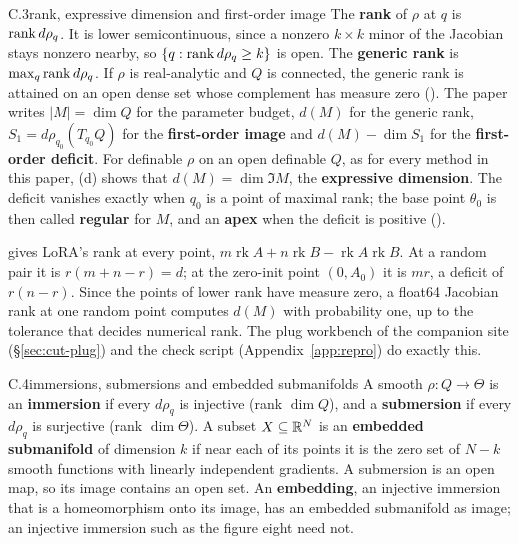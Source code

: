 \begin{bgentry}{C.3}{rank, expressive dimension and first-order image}
The \textbf{rank} of $\rho$ at $q$ is $\operatorname{rank} d\rho_q$. It is lower semicontinuous, since a nonzero $k\times k$ minor of
the Jacobian stays nonzero nearby, so $\{q:\operatorname{rank} d\rho_q\ge k\}$ is open. The \textbf{generic rank} is $\max_q\operatorname{rank}
d\rho_q$. If $\rho$ is real-analytic and $Q$ is connected, the generic rank is attained on an open dense set whose
complement has measure zero (). The paper writes $\lvert M\rvert=\dim Q$ for the parameter budget, $d(M)$
for the generic rank, $S_1=d\rho_{q_0}(T_{q_0}Q)$ for the \textbf{first-order image} and $d(M)-\dim S_1$ for the
\textbf{first-order deficit}. For definable $\rho$ on an open definable $Q$, as for every method in this paper,
(d) shows that $d(M)=\dim\Im M$, the \textbf{expressive dimension}. The deficit vanishes exactly when $q_0$
is a point of maximal rank; the base point $\theta_0$ is then called \textbf{regular} for $M$, and an \textbf{apex} when
the deficit is positive ().
\end{bgentry}

 gives LoRA's rank at every point,
$m\operatorname{rk}A+n\operatorname{rk}B-\operatorname{rk}A\operatorname{rk}B$. At a random pair it is $r(m+n-r)=d$; at
the zero-init point $(0,A_0)$ it is $mr$, a deficit of $r(n-r)$. Since the points of lower rank have measure zero, a
float64 Jacobian rank at one random point computes $d(M)$ with probability one, up to the tolerance that decides
numerical rank. The plug workbench of the companion site (\S\ref{sec:cut-plug}) and the check script
(Appendix~\ref{app:repro}) do exactly this.


\begin{bgentry}{C.4}{immersions, submersions and embedded submanifolds}
A smooth $\rho:Q\to\Theta$ is an \textbf{immersion} if every $d\rho_q$ is injective (rank $\dim Q$), and a
\textbf{submersion} if every $d\rho_q$ is surjective (rank $\dim\Theta$). A subset $X\subseteq\mathbb{R}^N$ is an
\textbf{embedded submanifold} of dimension $k$ if near each of its points it is the zero set of $N-k$ smooth functions
with linearly independent gradients. A submersion is an open map, so its image contains an open set. An
\textbf{embedding}, an injective immersion that is a homeomorphism onto its image, has an embedded submanifold as image;
an injective immersion such as the figure eight need not.
\end{bgentry}

